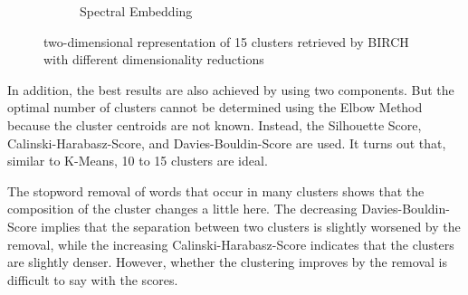 \begin{figure}
\begin{subfigure}{.3\textwidth}
  \caption{Spectral Embedding}
  \label{fig:birch_spectral}
\end{subfigure}
\caption{two-dimensional representation of 15 clusters retrieved by BIRCH with different dimensionality reductions}
\label{fig:birch}
\end{figure}
In addition, the best results are also achieved by using two components.
But the optimal number of clusters cannot be determined using the Elbow Method because the cluster centroids are not known.
Instead, the Silhouette Score, Calinski-Harabasz-Score, and Davies-Bouldin-Score are used.
It turns out that, similar to K-Means, 10 to 15 clusters are ideal.

The stopword removal of words that occur in many clusters shows that the composition of the cluster changes a little here.
The decreasing Davies-Bouldin-Score implies that the separation between two clusters is slightly worsened by the removal, while the increasing Calinski-Harabasz-Score indicates that the clusters are slightly denser.
However, whether the clustering improves by the removal is difficult to say with the scores.
